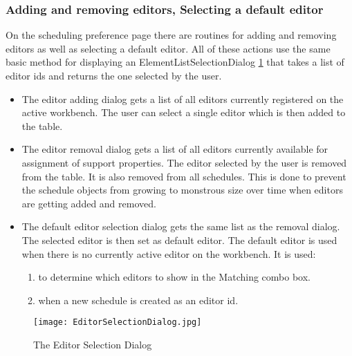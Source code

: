 \subsubsection{Adding and removing editors, Selecting a default editor}
On the scheduling preference page there are routines for adding and removing
editors as well as selecting a default editor.
All of these actions use the same basic method for displaying an ElementListSelectionDialog \ref{fig:EditorSelectionDialog}
that takes a list of editor ids and returns the one selected by the user.
\begin{itemize}
 \item The editor adding dialog gets a list of all editors currently registered on the
 active workbench. The user can select a single editor which is then added to the table.
 \item The editor removal dialog gets a list of all editors currently available for 
 assignment of support properties. The editor selected by the user is removed from the table.
 It is also removed from all schedules. This is done to prevent the schedule objects from growing
 to monstrous size over time when editors are getting added and removed.
 \item The default editor selection dialog gets the same list as the removal dialog. The selected
 editor is then set as default editor. The default editor is used when there is no currently active editor on the workbench.
  It is used:
  \begin{enumerate}
   \item to determine which editors to show in the Matching combo box.
   \item when a new schedule is created as an editor id.
  \end{enumerate}
\end{itemize}
\begin{figure}[EditorSelectionDialog]
  \centering
  \texttt{[image: EditorSelectionDialog.jpg]}
  \caption[Editor Selection Dialog]%
  {The Editor Selection Dialog\protect\footnotemark}
  \label{fig:EditorSelectionDialog}
\end{figure}